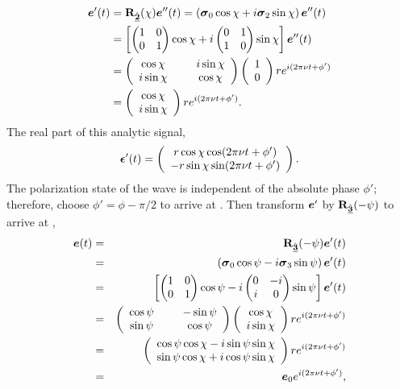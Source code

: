 \begin{equation} \begin{split}
\Jcol{e}'(t)
&= \vRotation[2](\chi) \Jcol{e}''(t)
 = \left( \pauli{0}\cos\chi + \Ci\pauli{2}\sin\chi \right) \Jcol{e}''(t) \\
&= \left[ \pauliI\cos\chi + \Ci\pauliU\sin\chi \right] \Jcol{e}''(t) \\
&= \left( 
      \begin{array}{ccc}
	\cos\chi & \;\; & \Ci\sin\chi \\
	\Ci\sin\chi & \;\; & \cos\chi
      \end{array}
   \right)
   \left(
      \begin{array}{c}
	1 \\
	0
      \end{array}
   \right) r e^{\Ci (2\pi \nu t + \phi')} \\
&= \left(
      \begin{array}{c}
	\cos\chi \\
	\Ci\sin\chi
      \end{array}
   \right) r e^{\Ci (2\pi \nu t + \phi')}.
\end{split} \end{equation}
The real part of this analytic signal,
\begin{equation}
	\Jcol{\epsilon}'(t)=
	\left( 
	\begin{array}{c}
		r \cos\chi \cos (2\pi \nu t + \phi') \\
		-r \sin\chi \sin (2\pi \nu t + \phi')
	\end{array}
	\right).
\end{equation}
The polarization state of the wave is independent of the absolute phase $\phi'$; therefore,
choose  $\phi'=\phi-\pi/2$ to arrive at .
%
Then transform $\Jcol{e}'$ by $\vRotation[3](-\psi)$ to arrive at ,
%
\begin{eqnarray}
\Jcol{e}(t)
&=& \vRotation[3](-\psi) \Jcol{e}'(t) \nonumber \\
&=& \left( \pauli{0}\cos\psi - \Ci\pauli{3}\sin\psi \right) \Jcol{e}'(t) \nonumber \\
&=& \left[ \pauliI\cos\psi - \Ci\pauliV\sin\psi \right] \Jcol{e}'(t) \nonumber \\
&=& \left( 
      \begin{array}{ccc}
	\cos\psi & \;\; & -\sin\psi \\
	\sin\psi & \;\; & \cos\psi
      \end{array}
   \right)
   \left(
      \begin{array}{c}
	\cos\chi \\
	\Ci\sin\chi
      \end{array}
   \right) r e^{\Ci (2\pi \nu t + \phi')} \nonumber \\
&=& \left(
      \begin{array}{c}
	\cos\psi\cos\chi -\Ci \sin\psi\sin\chi \\
	\sin\psi\cos\chi +\Ci \cos\psi\sin\chi
   \end{array}
   \right) r e^{\Ci (2\pi \nu t + \phi')} \nonumber \\
&=& \Jcol{e}_0  e^{\Ci (2\pi \nu t + \phi')},
\label{eqn:monochromatic_analytic}
\end{eqnarray}
